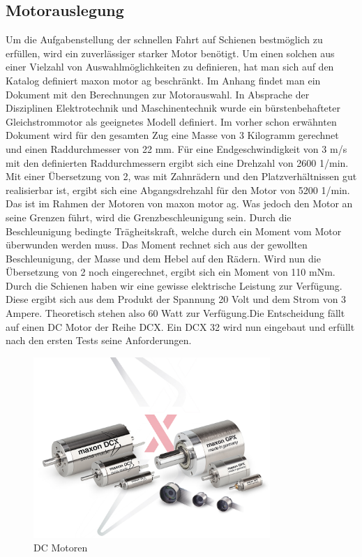 \documentclass[../../main.tex]{subfiles}
\begin{document}
    \subsection{Motorauslegung} \label{mt_motor}
          Um die Aufgabenstellung der schnellen Fahrt auf Schienen bestmöglich zu erfüllen, wird ein zuverlässiger
          starker Motor benötigt. Um einen solchen aus einer Vielzahl von Auswahlmöglichkeiten zu definieren, hat man
          sich auf den Katalog definiert maxon motor ag beschränkt. Im Anhang findet man ein Dokument mit den
          Berechnungen zur Motorauswahl. In Absprache der Disziplinen Elektrotechnik und Maschinentechnik wurde ein
          bürstenbehafteter Gleichstrommotor als geeignetes Modell definiert. Im vorher schon erwähnten Dokument wird für
          den gesamten Zug eine Masse von 3 Kilogramm gerechnet und einen Raddurchmesser von 22 mm. Für eine
          Endgeschwindigkeit von 3 m/s mit den definierten Raddurchmessern ergibt sich eine Drehzahl von 2600 1/min. Mit
          einer Übersetzung von 2, was mit Zahnrädern und den Platzverhältnissen gut realisierbar ist, ergibt sich eine
          Abgangsdrehzahl für den Motor von 5200 1/min. Das ist im Rahmen der Motoren von maxon motor ag. Was jedoch den
          Motor an seine Grenzen führt, wird die Grenzbeschleunigung sein. Durch die Beschleunigung bedingte
          Trägheitskraft, welche durch ein Moment vom Motor überwunden werden muss. Das Moment rechnet sich aus der
          gewollten Beschleunigung, der Masse und dem Hebel auf den Rädern. Wird nun die Übersetzung von 2 noch
          eingerechnet, ergibt sich ein Moment von 110 mNm. Durch die Schienen haben wir eine gewisse elektrische
          Leistung zur Verfügung. Diese ergibt sich aus dem Produkt der Spannung 20 Volt und dem Strom von 3 Ampere.
          Theoretisch stehen also 60
          Watt zur Verfügung.Die Entscheidung fällt auf einen DC Motor der Reihe DCX. Ein DCX 32 wird nun eingebaut und erfüllt nach den ersten Tests seine Anforderungen.

    \begin{figure}[H]
        \centering
        \includegraphics[width=0.8\textwidth]{Kran/Motors.JPG}
        \caption {DC Motoren}
    \end{figure}
\end{document}
